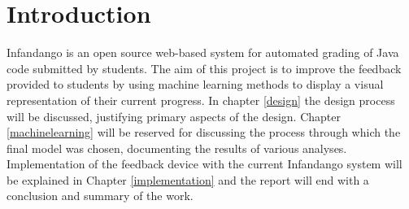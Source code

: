 \chapter{Introduction}
\label{introduction}
Infandango is an open source web-based system for automated grading of Java code submitted by students\cite{infandango_note}. The aim of this project is to improve the feedback provided to students by using machine learning methods to display a visual representation of their current progress. In chapter \ref{design} the design process will be discussed, justifying primary aspects of the design. Chapter \ref{machinelearning} will be reserved for discussing the process through which the final model was chosen, documenting the results of various analyses. Implementation of the feedback device with the current Infandango system will be explained in Chapter \ref{implementation} and the report will end with a conclusion and summary of the work.

